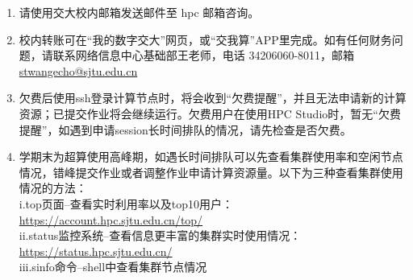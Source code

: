 \documentclass[cn, 12pt, hang, black, chinese]{elegantbook}
\begin{document}
\begin{enumerate}[itemsep=1.3ex]
  \item {}
    请使用交大校内邮箱发送邮件至 hpc 邮箱咨询。
  \item {}
    校内转账可在“我的数字交大”网页，或“交我算”APP里完成。如有任何财务问题，请联系网络信息中心基础部王老师，电话 34206060-8011，邮箱 \href{mailto:stwangecho@sjtu.edu.cn}{stwangecho@sjtu.edu.cn}
  \item {}
    欠费后使用ssh登录计算节点时，将会收到“欠费提醒”，并且无法申请新的计算资源；已提交作业将会继续运行。欠费用户在使用HPC Studio时，暂无“欠费提醒”，如遇到申请session长时间排队的情况，请先检查是否欠费。
  \item {}
    学期末为超算使用高峰期，如遇长时间排队可以先查看集群使用率和空闲节点情况，错峰提交作业或者调整作业申请计算资源量。以下为三种查看集群使用情况的方法：\\i.top页面--查看实时利用率以及top10用户：\href{https://account.hpc.sjtu.edu.cn/top/}{https://account.hpc.sjtu.edu.cn/top/}\\ii.status监控系统--查看信息更丰富的集群实时使用情况：\href{https://status.hpc.sjtu.edu.cn/}{https://status.hpc.sjtu.edu.cn/}\\iii.sinfo命令--shell中查看集群节点情况
\end{enumerate}
\end{document}
